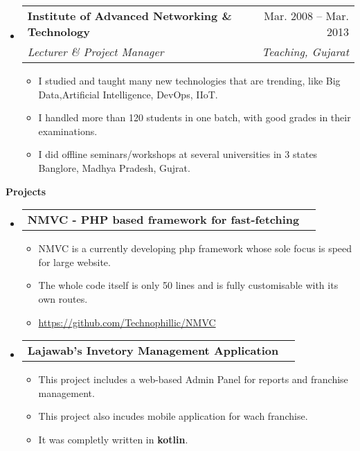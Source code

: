 \documentclass[letterpaper,12pt]{article}[leftmargin=*]
\makeatletter
\def \entryspacing {-0pt}
\renewcommand{\section}[2]{\vspace{5pt}
  \colorbox{secondary}{\color{white}\raggedbottom\normalsize\textbf{{#1}{\hspace{7pt}#2}}}
}
\newcommand{\resumeEntryStart}{\begin{itemize}[leftmargin=2.5mm]}
\newcommand{\resumeEntryEnd}{\end{itemize}\vspace{\entryspacing}}
\newcommand{\resumeItemListStart}{\begin{itemize}[leftmargin=4.5mm]}
\newcommand{\resumeItemListEnd}{\end{itemize}}
\newcommand{\resumeItem}[1]{
  \item\small{
    {#1 \vspace{-2pt}}
  }
}
\newcommand{\resumeEntryTSDL}[4]{
  \vspace{-1pt}\item[]
    \begin{tabularx}{0.97\textwidth}{X@{\hspace{60pt}}r}
      \textbf{\color{primary}#1} & {\firabook\color{accent}\small#2} \\
      \textit{\color{accent}\small#3} & \textit{\color{accent}\small#4} \\
    \end{tabularx}\vspace{-6pt}
}
\newcommand{\resumeEntryTD}[2]{
  \vspace{-1pt}\item[]
    \begin{tabularx}{0.97\textwidth}{X@{\hspace{60pt}}r}
      \textbf{\color{primary}#1} & {\firabook\color{accent}\small#2} \\
    \end{tabularx}\vspace{-6pt}
}
\makeatother
\begin{document}
  \resumeEntryStart
    \resumeEntryTSDL
      {Institute of Advanced Networking \& Technology}{Mar. 2008 -- Mar. 2013}
      {Lecturer \& Project Manager}{Teaching, Gujarat}
    \resumeItemListStart
      \resumeItem { I studied and taught many new technologies that are trending, like Big Data,\linebreak Artificial Intelligence, DevOps, IIoT.}
      \resumeItem{I handled more than 120 students in one batch, with good grades in their examinations.}
      \resumeItem{I did offline seminars/workshops at several universities in 3 states Banglore, Madhya Pradesh, Gujrat.}
    \resumeItemListEnd
  \resumeEntryEnd


\section{\faFlask}{Projects}

  \resumeEntryStart
    \resumeEntryTD
      {NMVC - PHP based framework for fast-fetching}{}
    \resumeItemListStart
      \resumeItem {NMVC is a currently developing php framework whose sole focus is speed for large website.}
      \resumeItem {The whole code itself is only 50 lines and is fully customisable with its own routes.}
      \resumeItem {\url{https://github.com/Technophillic/NMVC}}
    \resumeItemListEnd
  \resumeEntryEnd

  \resumeEntryStart
    \resumeEntryTD
      {Lajawab's Invetory Management Application}{}
    \resumeItemListStart
      \resumeItem {This project includes a web-based Admin Panel for reports and franchise management.}
      \resumeItem {This project also incudes mobile application for wach franchise.}
      \resumeItem{It was completly written in {\bf kotlin}.{\linebreak}}
    \resumeItemListEnd
  \resumeEntryEnd
\end{document}

